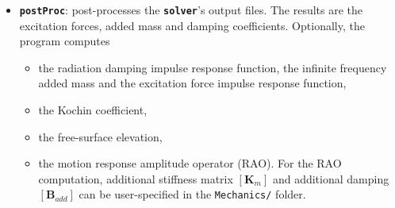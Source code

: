 \documentclass[12pt,a4paper,titlepage]{article}
\newcommand{\bs}{\boldsymbol}
\begin{document}
\begin{itemize}
\item \texttt{\textbf{postProc}}: post-processes the \texttt{\textbf{solver}}'s output files. The results are the excitation forces, added mass and damping coefficients. Optionally, the program computes 
\begin{itemize}
\item the radiation damping impulse response function, the infinite frequency added mass and the excitation force impulse response function,
\item the Kochin coefficient,
\item the free-surface elevation,
\item the motion response amplitude operator (RAO). For the RAO computation, additional stiffness matrix $[\bs K_m]$ and additional damping $[\bs B_{add}]$ can be user-specified in the \texttt{Mechanics/} folder.
\end{itemize}
\end{itemize}
\end{document}
